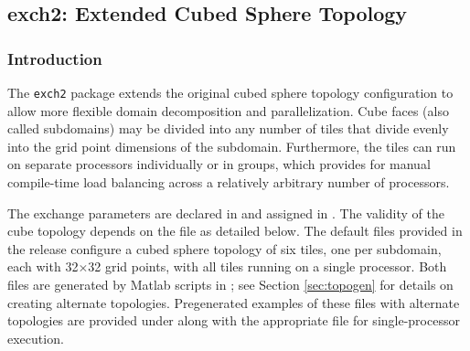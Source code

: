 


\subsection{exch2: Extended Cubed Sphere \mbox{Topology}}
\label{sec:exch2}


\subsubsection{Introduction}

The \texttt{exch2} package extends the original cubed sphere topology
configuration to allow more flexible domain decomposition and
parallelization.  Cube faces (also called subdomains) may be divided
into any number of tiles that divide evenly into the grid point
dimensions of the subdomain.  Furthermore, the tiles can run on
separate processors individually or in groups, which provides for
manual compile-time load balancing across a relatively arbitrary
number of processors.

The exchange parameters are declared in
and assigned in
. The
validity of the cube topology depends on the  file as
detailed below.  The default files provided in the release configure a
cubed sphere topology of six tiles, one per subdomain, each with
32$\times$32 grid points, with all tiles running on a single processor.  Both
files are generated by Matlab scripts in
; see Section
\ref{sec:topogen} 
for details on creating alternate topologies.  Pregenerated examples
of these files with alternate topologies are provided under
 along with the appropriate 
file for single-processor execution.

